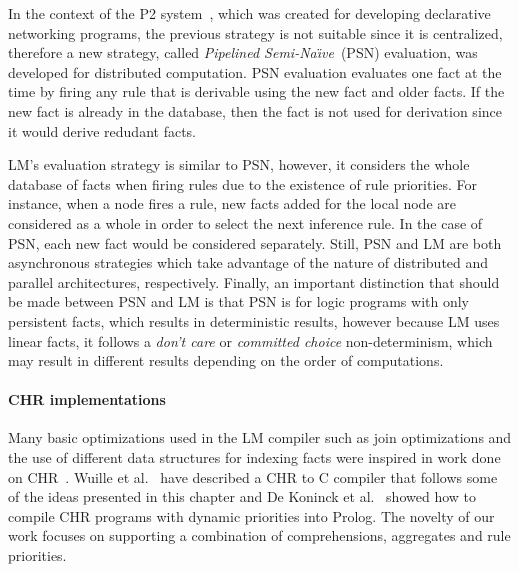 In the context of the P2 system~\cite{Loo-condie-garofalakis-p2}, which was
created for developing declarative networking programs, the previous strategy is
not suitable since it is centralized, therefore a new strategy, called
\emph{Pipelined Semi-Na\"{\i}ve}~(PSN) evaluation, was developed for distributed
computation. PSN evaluation evaluates one fact at the time by firing any rule
that is derivable using the new fact and older facts. If the new fact is already
in the database, then the fact is not used for derivation since it would derive
redudant facts.

LM's evaluation strategy is similar to PSN, however, it considers the whole
database of facts when firing rules due to the existence of rule priorities.
For instance, when a node fires a rule, new facts added for the local node are
considered as a whole in order to select the next inference rule. In the case of
PSN, each new fact would be considered separately. Still, PSN and LM are both
asynchronous strategies which take advantage of the nature of distributed and
parallel architectures, respectively. Finally, an important distinction that
should be made between PSN and LM is that PSN is for logic programs with only
persistent facts, which results in deterministic results, however because LM
uses linear facts, it follows a \emph{don't care} or \emph{committed choice}
non-determinism, which may result in different results depending on the order of
computations.

\paragraph{CHR implementations} Many basic optimizations used in the LM compiler
such as join optimizations and the use of different data structures for indexing
facts were inspired in work done on CHR~\cite{DBLP:journals/corr/cs-PL-0408025}.
Wuille et al.~\cite{42866} have described a CHR to C compiler that follows some
of the ideas presented in this chapter and De Koninck et al.~\cite{chrp} showed
how to compile CHR programs with dynamic priorities into Prolog. The novelty of
our work focuses on supporting a combination of comprehensions, aggregates and
rule priorities.

